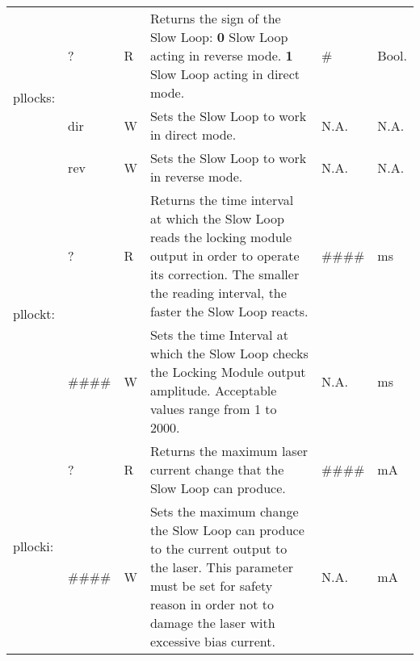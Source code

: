 \begin{center}
\begin{longtable}{| m{} | m{} | m{} | m{} | m{}| m{} |}
    \multirow{3}{0.1\textwidth}{pllocks:}  & ? & R & Returns the sign of the Slow Loop:
                                                \newline \textbf{0} Slow Loop acting in reverse mode.
                                                \newline \textbf{1} Slow Loop acting in direct mode. &  \# & Bool. \\
                                        \cline{2-6}
                                        &  dir & W & Sets the Slow Loop to work in direct mode. & N.A. & N.A. \\
                                        \cline{2-6}
                                        &  rev & W & Sets the Slow Loop to work in reverse mode. & N.A. & N.A. \\
    \hline
    
    \multirow{2}{0.1\textwidth}{pllockt:}  & ? & R & Returns the time interval at which the  Slow Loop reads the locking module output in order to operate its correction.
                                                        \newline The smaller the reading interval, the faster the Slow Loop   reacts. & \#\#\#\# & ms\\
                                        \cline{2-6}
                                        &  \#\#\#\# & W & Sets the time Interval at which the Slow Loop checks the Locking Module output amplitude.
                                        \newline Acceptable values range from 1 to 2000. & N.A. & ms \\
    \hline
    
    \multirow{2}{0.1\textwidth}{pllocki:}  & ? & R & Returns the maximum laser current change that the Slow Loop can produce. & \#\#\#\# & mA\\
                                        \cline{2-6}
                                        &  \#\#\#\# & W & Sets the maximum change the Slow Loop can produce to the current output to the laser. 
                                        \newline This parameter must be set for safety reason in order not to damage the laser with excessive bias current. & N.A. & mA \\
    \hline
    
    \end{longtable}
\end{center}




